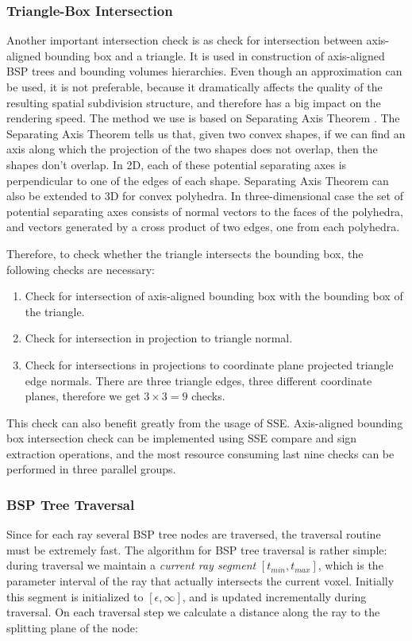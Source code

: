 \documentclass{article}
\begin{document}
\subsubsection{Triangle-Box Intersection}
Another important intersection check is as check for intersection between axis-aligned bounding box and a triangle. It is used in construction of axis-aligned BSP trees and bounding volumes hierarchies. Even though an approximation can be used, it is not preferable, because it dramatically affects the quality of the resulting spatial subdivision structure, and therefore has a big impact on the rendering speed. The method we use is based on Separating Axis Theorem \cite{eberly01}. The Separating Axis Theorem tells us that, given two convex shapes, if we can find an axis along which the projection of the two shapes does not overlap, then the shapes don't overlap. In 2D, each of these potential separating axes is perpendicular to one of the edges of each shape. Separating Axis Theorem can also be extended to 3D for convex polyhedra. In three-dimensional case the set of potential separating axes consists of normal vectors to the faces of the polyhedra, and vectors generated by a cross product of two edges, one from each polyhedra.

Therefore, to check whether the triangle intersects the bounding box, the following checks are necessary:

\begin{enumerate}
\item Check for intersection of axis-aligned bounding box with the bounding box of the triangle.
\item Check for intersection in projection to triangle normal.
\item Check for intersections in projections to coordinate plane projected triangle edge normals. There are three triangle edges, three different coordinate planes, therefore we get $3 \times 3 = 9$ checks.
\end{enumerate}

This check can also benefit greatly from the usage of SSE. Axis-aligned bounding box intersection check can be implemented using SSE compare and sign extraction operations, and the most resource consuming last nine checks can be performed in three parallel groups.


\subsubsection{BSP Tree Traversal}
Since for each ray several BSP tree nodes are traversed, the traversal routine must be extremely fast. The algorithm for BSP tree traversal is rather simple: during traversal we maintain a {\it current ray segment} $[ t_{min}, t_{max} ]$, which is the parameter interval of the ray that actually intersects the current voxel. Initially this segment is initialized to $[ \epsilon, \infty ]$, and is updated incrementally during traversal. On each traversal step we calculate a distance along the ray to the splitting plane of the node:
\end{document}
